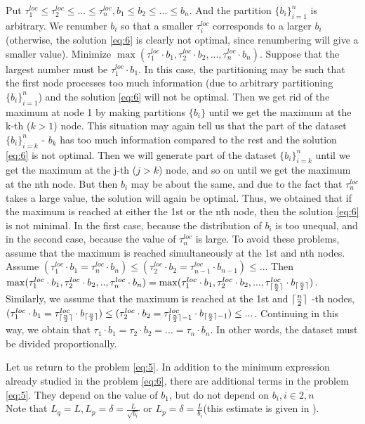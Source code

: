 \documentclass{article}
\DeclarePairedDelimiter\ceil{\lceil}{\rceil}
\begin{document}
Put $\tau_1^{loc}\leq \tau_2^{loc}\leq ... \leq \tau_n^{loc}, b_1\leq b_2\leq ... \leq b_n$. 
And the partition $\{b_i\}_{i = 1}^n$ is arbitrary. We renumber $b_i$ so that a smaller $\tau_i^{loc}$ corresponds to a larger $b_i$ (otherwise, the solution \ref{eq:6} is clearly not optimal, since renumbering will give a smaller value). Minimize $\max(\tau_1^{loc}\cdot b_1, \tau_2^{loc}\cdot b_2, ..., \tau_n^{loc}\cdot b_n)$. Suppose that the largest number must be $\tau_1^{loc}\cdot b_1$. In this case, the partitioning may be such that the first node processes too much information (due to arbitrary partitioning $\{b_i\}_{i = 1}^n$) and the solution \ref{eq:6} will not be optimal. Then we get rid of the maximum at node 1 by making partitions $\{b_i\}$ until we get the maximum at the k-th ($k > 1$) node. This situation may again tell us that the part of the dataset $\{b_i\}_{i = k}^n$ - $b_k$ has too much information compared to the rest and the solution \ref{eq:6} is not optimal. Then we will generate part of the dataset $\{b_i\}_{i = k}^n$ until we get the maximum at the j-th ($j > k$) node, and so on until we get the maximum at the nth node. But then $b_i$ may be about the same, and due to the fact that $\tau_n^{loc}$ takes a large value, the solution will again be optimal. Thus, we obtained that if the maximum is reached at either the 1st or the nth node, then the solution \ref{eq:6} is not minimal. In the first case, because the distribution of $b_i$ is too unequal, and in the second case, because the value of $\tau_n^{loc}$ is large. To avoid these problems, assume that the maximum is reached simultaneously at the 1st and nth nodes. Assume $(\tau_1^{loc}\cdot b_1 = \tau_n^{loc}\cdot b_n)\leq (\tau_2^{loc}\cdot b_2 = \tau_{n-1}^{loc}\cdot b_{n-1})\leq ...$ Then $\max(\tau_1^{loc}\cdot b_1, \tau_2^{loc}\cdot b_2, . ., \tau_n^{loc}\cdot b_n) = \max(\tau_1^{loc}\cdot b_1, \tau_2^{loc}\cdot b_2, ..., \tau_{\ceil{\frac{n}{2}}}^{loc}\cdot b_{\ceil{\frac{n}{2}}})$. Similarly, we assume that the maximum is reached at the 1st and $\ceil{\frac{n}{2}}$ -th nodes, $(\tau_1^{loc}\cdot b_1 = \tau_{\ceil{\frac{n}{2}}}^{loc}\cdot b_{\ceil{\frac{n}{2}}})\leq (\tau_2^{loc}\cdot b_2 = \tau_{\ceil{\frac{n}{2}}-1}^{loc}\cdot b_{\ceil{\frac{n}{2}}-1})\leq . ..$. Continuing in this way, we obtain that $\tau_1\cdot b_1 = \tau_2\cdot b_2 = ... = \tau_n\cdot b_n$. In other words, the dataset must be divided proportionally.

Let us return to the problem \ref{eq:5}. In addition to the minimum expression already studied in the problem \ref{eq:6}, there are additional terms in the problem \ref{eq:5}. They depend on the value of $b_1$, but do not depend on $b_i, i \in \overline{2, n}$
\\
Note that $L_q = L, L_p = \delta = \frac{L}{\sqrt{b_i}}$ or $L_p = \delta = \frac{L}{b_i}$(this estimate is given in \cite{kovalev2022optimal}).  
\end{document}
